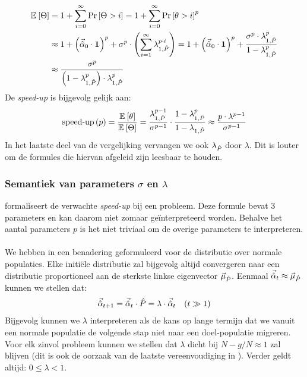 \begin{equation}
\begin{aligned}
\mean{\phittime}&=1+\displaystyle\sum_{i=0}^{\infty}{\Prob{\phittime>i}}=1+\displaystyle\sum_{i=0}^{\infty}{\Prob{\hittime>i}^p}\\
&\approx 1+\brak{\vec{\hat{\alpha}}_0\cdot\onematrix}^p+\sigma^p\cdot\brak{\displaystyle\sum_{i=1}^{\infty}\lambda_{1,\hat{P}}^{p\cdot i}}=1+\brak{\vec{\hat{\alpha}}_0\cdot\onematrix}^p+\displaystyle\frac{\sigma^p\cdot\lambda_{1,\hat{P}}^p}{1-\lambda_{1,\hat{P}}^p}\\
&\approx\displaystyle\frac{\sigma^p}{\brak{1-\lambda_{1,\hat{P}}^p}\cdot\lambda_{1,\hat{P}}^{p}}
\end{aligned}
\eqnlab{probabilityPower}
\end{equation}
De \emph{speed-up} is bijgevolg gelijk aan:
\begin{equation}
\funm{speed-up}{p}=\displaystyle\frac{\mean{\hittime}}{\mean{\phittime}}=\displaystyle\frac{\lambda_{1,\hat{P}}^{p-1}}{\sigma^{p-1}}\cdot\displaystyle\frac{1-\lambda_{1,\hat{P}}^{p}}{1-\lambda_{1,\hat{P}}}\approx\displaystyle\frac{p\cdot\lambda^{p-1}}{\sigma^{p-1}}
\eqnlab{speedupMetaheuristic}
\end{equation}
In het laatste deel van de vergelijking vervangen we ook $\ev[\hat{P}]$ door $\lambda$. Dit is louter om de formules die hiervan afgeleid zijn leesbaar te houden.

\subsubsection{Semantiek van parameters $\sigma$ en $\lambda$}

 formaliseert de verwachte \emph{speed-up} bij een probleem. Deze formule bevat 3 parameters en kan daarom niet zomaar ge\"interpreteerd worden. Behalve het aantal parameters $p$ is het niet triviaal om de overige parameters te interpreteren.

\paragraph{}
We hebben in  een benadering geformuleerd voor de distributie over normale populaties. Elke initi\"ele distributie zal bijgevolg altijd convergeren naar een distributie proportioneel aan de sterkste linkse eigenvector $\evl[\hat{P}]$. Eenmaal $\vec{\hat{\alpha}}_t\approx\evl[\hat{P}]$ kunnen we stellen dat:
\begin{equation}
\conditional{\vec{\hat{\alpha}}_{t+1}=\vec{\hat{\alpha}}_t\cdot\hat{P}=\lambda\cdot\vec{\hat{\alpha}}_{t}}{$t\gg 1$}
\end{equation}
Bijgevolg kunnen we $\lambda$ interpreteren als de kans op lange termijn dat we vanuit een normale populatie de volgende stap niet naar een doel-populatie migreren. Voor elk zinvol probleem kunnen we stellen dat $\lambda$ dicht bij $N-g/N\approx 1$ zal blijven (dit is ook de oorzaak van de laatste vereenvoudiging in ). Verder geldt altijd: $0\leq\lambda<1$.


